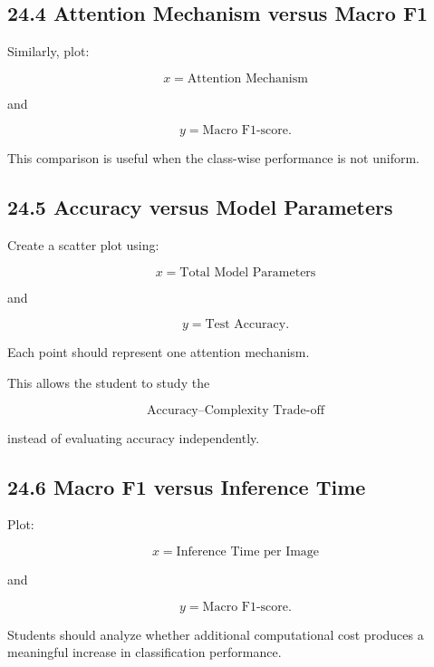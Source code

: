 \documentclass[10pt]{article}
\begin{document}
\subsection*{24.4 Attention Mechanism versus Macro F1}

Similarly, plot:

\[
x=
\text{Attention Mechanism}
\]

and

\[
y=
\text{Macro F1-score}.
\]

This comparison is useful when the class-wise performance is not uniform.

\subsection*{24.5 Accuracy versus Model Parameters}

Create a scatter plot using:

\[
x=
\text{Total Model Parameters}
\]

and

\[
y=
\text{Test Accuracy}.
\]

Each point should represent one attention mechanism.

This allows the student to study the

\[
\boxed{
\text{Accuracy--Complexity Trade-off}
}
\]

instead of evaluating accuracy independently.

\subsection*{24.6 Macro F1 versus Inference Time}

Plot:

\[
x=
\text{Inference Time per Image}
\]

and

\[
y=
\text{Macro F1-score}.
\]

Students should analyze whether additional computational cost produces a
meaningful increase in classification performance.

\end{document}
